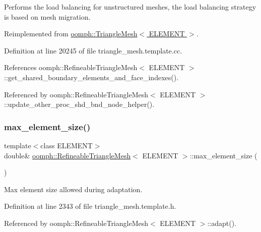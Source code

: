 Performs the load balancing for unstructured meshes, the load balancing strategy is based on mesh migration. 



Reimplemented from \hyperlink{classoomph_1_1TriangleMesh_a712bfd68d4b55e9c475347c0146fc8ac}{oomph\+::\+Triangle\+Mesh$<$ E\+L\+E\+M\+E\+N\+T $>$}.



Definition at line 20245 of file triangle\+\_\+mesh.\+template.\+cc.



References oomph\+::\+Refineable\+Triangle\+Mesh$<$ E\+L\+E\+M\+E\+N\+T $>$\+::get\+\_\+shared\+\_\+boundary\+\_\+elements\+\_\+and\+\_\+face\+\_\+indexes().



Referenced by oomph\+::\+Refineable\+Triangle\+Mesh$<$ E\+L\+E\+M\+E\+N\+T $>$\+::update\+\_\+other\+\_\+proc\+\_\+shd\+\_\+bnd\+\_\+node\+\_\+helper().

\mbox{\label{classoomph_1_1RefineableTriangleMesh_a60fabb7d4e9389f827d6cfd332237c15}} 
\subsubsection{\texorpdfstring{max\+\_\+element\+\_\+size()}{max\_element\_size()}}
{\footnotesize\ttfamily template$<$class E\+L\+E\+M\+E\+NT$>$ \\
double\& \hyperlink{classoomph_1_1RefineableTriangleMesh}{oomph\+::\+Refineable\+Triangle\+Mesh}$<$ E\+L\+E\+M\+E\+NT $>$\+::max\+\_\+element\+\_\+size (\begin{DoxyParamCaption}{ }\end{DoxyParamCaption})\hspace{0.3cm}{\ttfamily [inline]}}



Max element size allowed during adaptation. 



Definition at line 2343 of file triangle\+\_\+mesh.\+template.\+h.



Referenced by oomph\+::\+Refineable\+Triangle\+Mesh$<$ E\+L\+E\+M\+E\+N\+T $>$\+::adapt().


